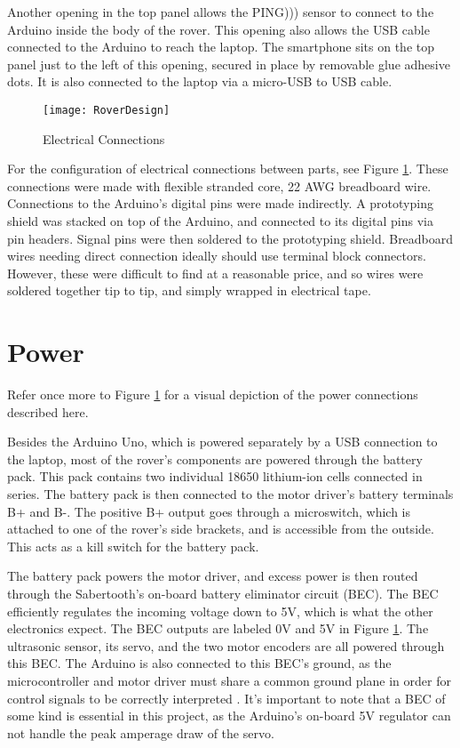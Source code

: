 Another opening in the top panel allows the PING))) sensor to connect to the Arduino inside the body of the rover. This opening also allows the USB cable connected to the Arduino to reach the laptop. The smartphone sits on the top panel just to the left of this opening, secured in place by removable glue adhesive dots. It is also connected to the laptop via a micro-USB to USB cable.

\begin{figure}[p] 
	\caption{Electrical Connections}
	\texttt{[image: RoverDesign]}
	\centering
	\label{figRoverDesign}
\end{figure}

For the configuration of electrical connections between parts, see Figure \ref{figRoverDesign}. These connections were made with flexible stranded core, 22 AWG breadboard wire. Connections to the Arduino's digital pins were made indirectly. A prototyping shield was stacked on top of the Arduino, and connected to its digital pins via pin headers. Signal pins were then soldered to the prototyping shield. Breadboard wires needing direct connection ideally should use terminal block connectors. However, these were difficult to find at a reasonable price, and so wires were soldered together tip to tip, and simply wrapped in electrical tape.

\section{Power}
Refer once more to Figure \ref{figRoverDesign} for a visual depiction of the power connections described here.

Besides the Arduino Uno, which is powered separately by a USB connection to the laptop, most of the rover's components are powered through the battery pack. This pack contains two individual 18650 lithium-ion cells connected in series. The battery pack is then connected to the motor driver's battery terminals B+ and B-. The positive B+ output goes through a microswitch, which is attached to one of the rover's side brackets, and is accessible from the outside. This acts as a kill switch for the battery pack.

The battery pack powers the motor driver, and excess power is then routed through the Sabertooth's on-board battery eliminator circuit (BEC). The BEC efficiently regulates the incoming voltage down to 5V, which is what the other electronics expect. The BEC outputs are labeled 0V and 5V in Figure \ref{figRoverDesign}. The ultrasonic sensor, its servo, and the two motor encoders are all powered through this BEC. The Arduino is also connected to this BEC's ground, as the microcontroller and motor driver must share a common ground plane in order for control signals to be correctly interpreted \cite{sabertoothUserGuide}. It's important to note that a BEC of some kind is essential in this project, as the Arduino's on-board 5V regulator can not handle the peak amperage draw of the servo.

